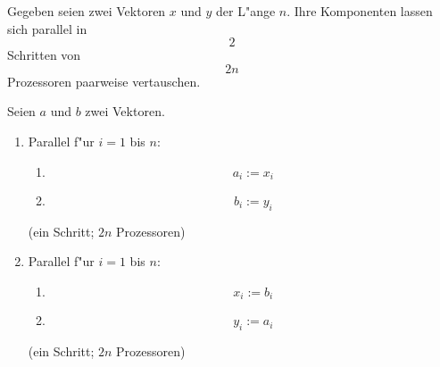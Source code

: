 \begin{satz}
\label{SatzAlgSwap}
    Gegeben seien zwei Vektoren $x$ und $y$ der L"ange $n$. Ihre Komponenten
    lassen sich parallel in \[ 2 \] Schritten von \[ 2n \] Prozessoren
    paarweise vertauschen.
\end{satz}
\begin{beweis}
    Seien $a$ und $b$ zwei Vektoren.
    \begin{enumerate}
    \item
         Parallel f"ur $i=1$ bis $n$:
         \begin{enumerate}
         \item
              \[ a_i := x_i \]
         \item
              \[ b_i := y_i \]
         \end{enumerate}
         (ein Schritt; $2n$ Prozessoren)
    \item
         Parallel f"ur $i=1$ bis $n$:
         \begin{enumerate}
         \item
              \[ x_i := b_i \]
         \item
              \[ y_i := a_i \]
         \end{enumerate}
         (ein Schritt; $2n$ Prozessoren)
    \end{enumerate}
\end{beweis}

